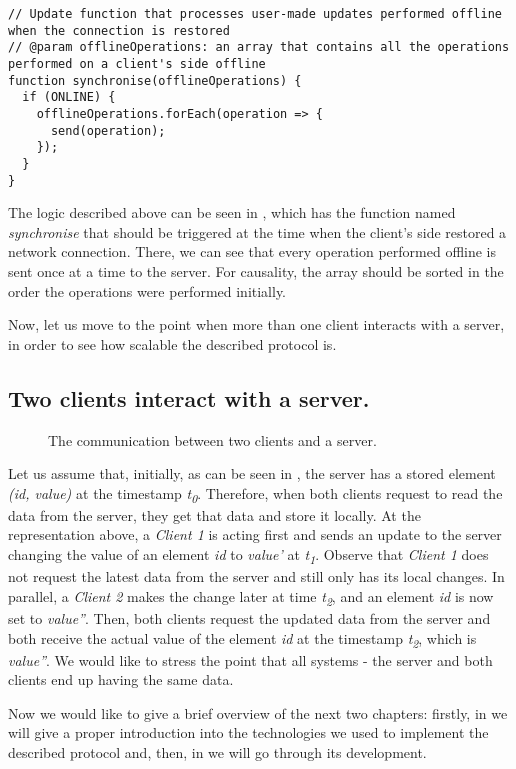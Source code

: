 \begin{lstlisting}[caption={Pseudocode for sending offline performed operations to the server: client.}, label={lst:offline}]
// Update function that processes user-made updates performed offline when the connection is restored
// @param offlineOperations: an array that contains all the operations performed on a client's side offline
function synchronise(offlineOperations) {
  if (ONLINE) {
    offlineOperations.forEach(operation => {
      send(operation);
    });
  }
}
\end{lstlisting} 

The logic described above can be seen in , which has the function named \textit{synchronise} that should be triggered at the time when the client's side restored a network connection. There, we can see that every operation performed offline is sent once at a time to the server. For causality, the array should be sorted in the order the operations were performed initially.

Now, let us move to the point when more than one client interacts with a server, in order to see how scalable the described protocol is.

\subsection*{Two clients interact with a server.}

\begin{figure}[!htb]
    \begin{center}
    \def\svgwidth{\linewidth}
    
    \caption {The communication between two clients and a server.}
    \label{fig:design5}
\end{center}
\end{figure}

Let us assume that, initially, as can be seen in , the server has a stored element \textit{(id, value)} at the timestamp \textit{t\textsubscript{0}}. Therefore, when both clients request to read the data from the server, they get that data and store it locally. At the representation above, a \textit{Client 1} is acting first and sends an update to the server changing the value of an element \textit{id} to \textit{value'} at \textit{t\textsubscript{1}}. Observe that \textit{Client 1} does not request the latest data from the server and still only has its local changes. In parallel, a \textit{Client 2} makes the change later at time \textit{t\textsubscript{2}}, and an element \textit{id} is now set to \textit{value''}. Then, both clients request the updated data from the server and both receive the actual value of the element \textit{id} at the timestamp \textit{t\textsubscript{2}}, which is \textit{value''}. We would like to stress the point that all systems - the server and both clients end up having the same data.

Now we would like to give a brief overview of the next two chapters: firstly, in  we will give a proper introduction into the technologies we used to implement the described protocol and, then, in  we will go through its development.